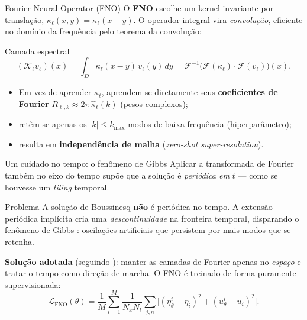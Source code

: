 \begin{frame}{Fourier Neural Operator (FNO)}
  O \textbf{FNO} \parencite{li2020fourier} escolhe um \alert{kernel invariante por translação},
  $\kappa_\ell(x,y)=\kappa_\ell(x-y)$. O operador integral vira \emph{convolução}, eficiente
  no domínio da frequência pelo teorema da convolução:
  \begin{block}{Camada espectral}
    \begin{equation*}
      (\mathcal{K}_\ell v_\ell)(x) = \int_D \kappa_\ell(x-y)\,v_\ell(y)\,dy
      = \mathcal{F}^{-1}\!\bigl(\mathcal{F}(\kappa_\ell)\cdot\mathcal{F}(v_\ell)\bigr)(x).
    \end{equation*}
  \end{block}
  \begin{itemize}
    \item Em vez de aprender $\kappa_\ell$, aprendem-se diretamente seus
          \textbf{coeficientes de Fourier} $R_{\ell,k} \approx 2\pi\,\hat\kappa_\ell(k)$ (pesos complexos);
    \item retêm-se apenas os \alert{$|k|\le k_{\max}$} modos de baixa frequência (hiperparâmetro);
    \item resulta em \textbf{independência de malha} (\emph{zero-shot super-resolution}).
  \end{itemize}
\end{frame}

\begin{frame}{Um cuidado no tempo: o fenômeno de Gibbs}
  Aplicar a transformada de Fourier \alert{também no eixo do tempo} supõe que a solução é
  \emph{periódica em $t$} --- como se houvesse um \emph{tiling} temporal.

  \vspace{0.2cm}
  \begin{alertblock}{Problema}
    A solução de Boussinesq \textbf{não} é periódica no tempo. A extensão periódica implícita
    cria uma \emph{descontinuidade} na fronteira temporal, disparando o
    \alert{fenômeno de Gibbs} \parencite{gibbs1899}: oscilações artificiais que persistem por
    mais modos que se retenha.
  \end{alertblock}

  \textbf{Solução adotada} (seguindo \textcite{li2020fourier}): manter as camadas de Fourier
  apenas no \emph{espaço} e tratar o tempo como \alert{direção de marcha}. O FNO é treinado de
  forma puramente supervisionada:
  \begin{equation*}
    \mathcal{L}_{\text{FNO}}(\theta) = \frac{1}{M}\sum_{i=1}^{M}\frac{1}{N_x N_t}\sum_{j,n}
    \bigl[(\eta_\theta^i - \eta_i)^2 + (u_\theta^i - u_i)^2\bigr].
  \end{equation*}
\end{frame}

